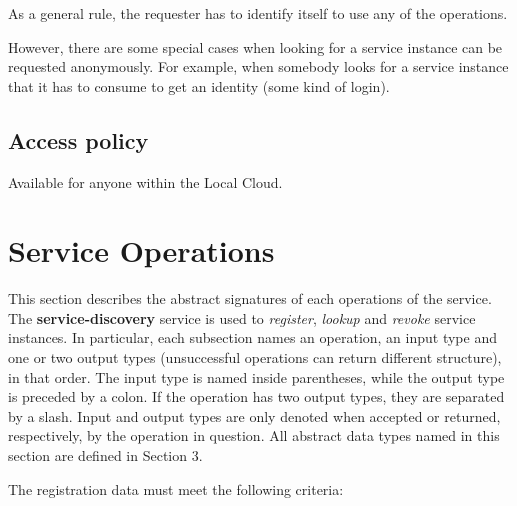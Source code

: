 \documentclass[a4paper]{arrowhead}
\begin{document}
As a general rule, the requester has to identify itself to use any of the operations.

However, there are some special cases when looking for a service instance can be requested anonymously. For example, when somebody looks for a service instance that it has to consume to get an identity (some kind of login).

\subsection{Access policy}
\label{sec:accesspolicy}

Available for anyone within the Local Cloud.

\newpage

\section{Service Operations}
\label{sec:functions}

This section describes the abstract signatures of each operations of the service. The \textbf{service-discovery} service is used to \textit{register}, \textit{lookup} and \textit{revoke} service instances.
In particular, each subsection names an operation, an input type and one or two output types (unsuccessful operations can return different structure), in that order.
The input type is named inside parentheses, while the output type is preceded by a colon. If the operation has two output types, they are separated by a slash.
Input and output types are only denoted when accepted or returned, respectively, by the operation in question. All abstract data types named in this section are defined in Section 3.


The registration data must meet the following criteria:
\end{document}
